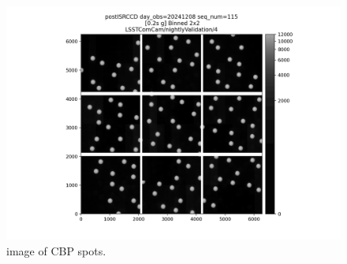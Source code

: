 \begin{figure}
  \begin{center}
    \includegraphics[height=0.4\textheight]{throughput_for_focused_light_figures/cbp-spots}
  \end{center}
  \caption{\ComCam image of CBP spots.}
  \label{fig:cbp_spots}
\end{figure}

